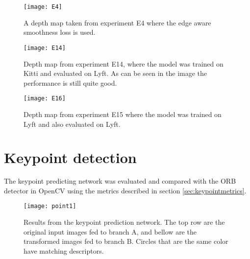 \begin{figure}[H]
	\centering
	\texttt{[image: E4]}
	\caption{A depth map taken from experiment E4 where the edge aware smoothness loss is used.}
	\label{fig:E4}
\end{figure}

\begin{figure}[H]
	\centering
	\texttt{[image: E14]}
	\caption{Depth map from experiment E14, where the model was trained on Kitti and evaluated on Lyft. As can be seen in the image the performance is still quite good.}
	\label{fig:E14}
\end{figure}

\begin{figure}[H]
	\centering
	\texttt{[image: E16]}
	\caption{Depth map from experiment E15 where the model was trained on Lyft and also evaluated on Lyft.}
	\label{fig:E16}
\end{figure}

\iffalse
\begin{figure}[H]
	\centering
	\texttt{[image: evaluation]}
	\caption{Evaluation metrics when testing the configurations on the testing split of the datasets}
	\label{fig:evaluation}
\end{figure}

\begin{figure}[H]
	\centering
	\texttt{[image: depthmapslyft]}
	\caption{Examples from the Lyft dataset}
	\label{fig:depthmaplyft}
\end{figure}
\fi


\section{Keypoint detection}

The keypoint predicting network was evaluated and compared with the ORB detector in OpenCV using the metrics described in section \ref{sec:keypointmetrics}.

\begin{figure}[H]
	\centering
	\texttt{[image: point1]}
	\caption{Results from the keypoint prediction network. The top row are the original input images fed to branch A, and bellow are the transformed images fed to branch B. Circles that are the same color have matching descriptors.}
	\label{fig:point1}
\end{figure}

